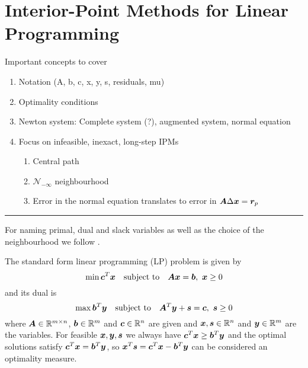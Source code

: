 \chapter{Interior-Point Methods for Linear Programming}

Important concepts to cover
\begin{enumerate}
 \item Notation (A, b, c, x, y, s, residuals, mu)
 \item Optimality conditions
 \item Newton system: Complete system (?), augmented system, normal equation
 \item Focus on infeasible, inexact, long-step IPMs
 \begin{enumerate}
   \item Central path
   \item \(\mathcal{N}_{-\infty}\) neighbourhood
   \item Error in the normal equation translates to error in \(\bm{A}\Delta\bm{x} = \bm{r}_p\)
 \end{enumerate}
\end{enumerate}

\hrule

For naming primal, dual and slack variables as well as the choice of the neighbourhood we follow \cite{Monteiro-ConvergenceAnalysisLongStepInfeasibleIPMs}.

The standard form linear programming (LP) problem is given by
\begin{equation}
 \min \bm{c}^T \bm{x} \quad \text{subject to} \quad \bm{A}\bm{x} = \bm{b}, \ \bm{x} \geq 0
\end{equation}
and its dual is
\begin{equation}
  \max \bm{b}^T \bm{y} \quad \text{subject to} \quad \bm{A}^T \bm{y} + \bm{s} = \bm{c}, \ \bm{s} \geq 0
\end{equation}
where \(\bm{A} \in \mathbb{R}^{m \times n}\), \(\bm{b} \in \mathbb{R}^m\) and \(\bm{c} \in \mathbb{R}^n\) are given and \(\bm{x}, \bm{s} \in \mathbb{R}^n\) and \(\bm{y} \in \mathbb{R}^m\) are the variables.
For feasible \(\bm{x}, \bm{y}, \bm{s}\) we always have \(\bm{c}^T \bm{x} \geq \bm{b}^T \bm{y}\) and the optimal solutions satisfy \(\bm{c}^T \bm{x} = \bm{b}^T \bm{y}\), so \(\bm{x}^T \bm{s} = \bm{c}^T \bm{x} - \bm{b}^T \bm{y}\) can be considered an optimality measure.

